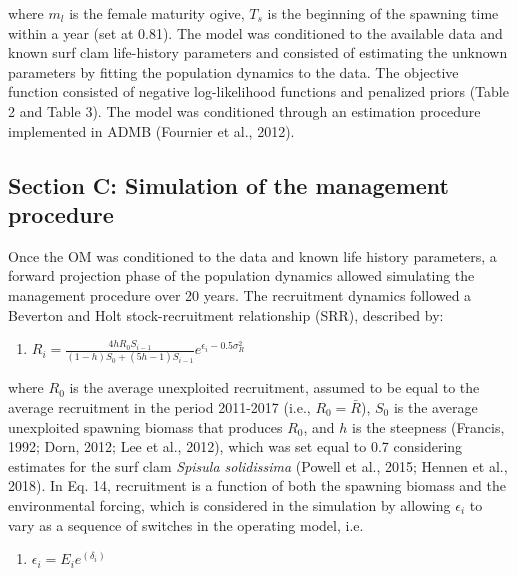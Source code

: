 \documentclass[12pt]{article}
\providecommand{\tightlist}{%
  \setlength{\itemsep}{0pt}\setlength{\parskip}{0pt}}
\begin{document}
where \(m_l\) is the female maturity ogive, \(T_s\) is the beginning of
the spawning time within a year (set at 0.81). The model was conditioned
to the available data and known surf clam life-history parameters and
consisted of estimating the unknown parameters by fitting the population
dynamics to the data. The objective function consisted of negative
log-likelihood functions and penalized priors (Table 2 and Table 3). The
model was conditioned through an estimation procedure implemented in
ADMB (Fournier et al., 2012).

\hypertarget{section-c-simulation-of-the-management-procedure}{%
\subsection{Section C: Simulation of the management
procedure}\label{section-c-simulation-of-the-management-procedure}}

Once the OM was conditioned to the data and known life history
parameters, a forward projection phase of the population dynamics
allowed simulating the management procedure over 20 years. The
recruitment dynamics followed a Beverton and Holt stock-recruitment
relationship (SRR), described by:

\begin{enumerate}
\def\labelenumi{\arabic{enumi})}
\setcounter{enumi}{13}
\tightlist
\item
  \(R_i=\frac{4 h R_0 S_{i-1}}{(1-h) S_0+(5h-1) S_{i-1}} e^{\epsilon_i - 0.5\sigma_R^2}\)
\end{enumerate}

where \(R_0\) is the average unexploited recruitment, assumed to be
equal to the average recruitment in the period 2011-2017 (i.e.,
\(R_0=\bar{R}\)), \(S_0\) is the average unexploited spawning biomass
that produces \(R_0\), and \(h\) is the steepness (Francis, 1992; Dorn,
2012; Lee et al., 2012), which was set equal to 0.7 considering
estimates for the surf clam \emph{Spisula solidissima} (Powell et al.,
2015; Hennen et al., 2018). In Eq. 14, recruitment is a function of both
the spawning biomass and the environmental forcing, which is considered
in the simulation by allowing \(\epsilon_i\) to vary as a sequence of
switches in the operating model, i.e.

\begin{enumerate}
\def\labelenumi{\arabic{enumi})}
\setcounter{enumi}{14}
\tightlist
\item
  \(\epsilon_i=E_i e^{(\delta_i)}\)
\end{enumerate}
\end{document}
